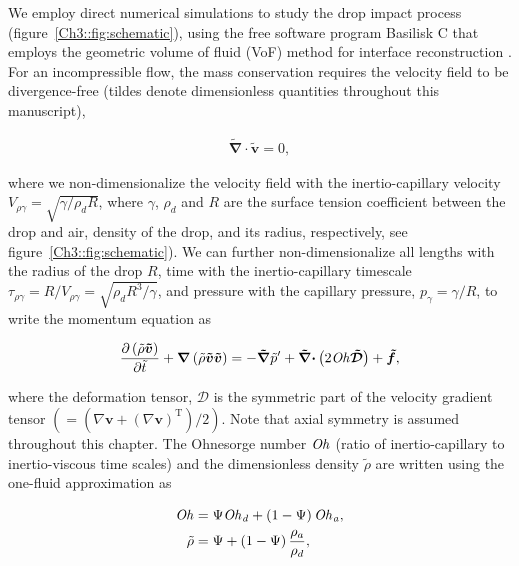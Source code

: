 We employ direct numerical simulations to study the drop impact process (figure~\ref{Ch3::fig:schematic}), using the free software program Basilisk C \citep{basiliskpopinet1} that employs the geometric volume of fluid (VoF) method for interface reconstruction \citep{popinet2009accurate}. For an incompressible flow, the mass conservation requires the velocity field to be divergence-free (tildes denote dimensionless quantities throughout this manuscript),

\begin{align}
	\boldsymbol{\tilde{\nabla}\cdot \tilde{v}} = 0,
\end{align}

\noindent where we non-dimensionalize the velocity field with the inertio-capillary velocity $ V_{\rho\gamma} = \sqrt{\gamma/\rho_d R}$, where $\gamma$, $\rho_d$ and $R$ are the surface tension coefficient between the drop and air, density of the drop, and its radius, respectively, see figure~\ref{Ch3::fig:schematic}). We can further non-dimensionalize all lengths with the radius of the drop $R$, time with the inertio-capillary timescale $\tau_{\rho\gamma} = R/V_{\rho\gamma} = \sqrt{\rho_dR^3/\gamma}$, and pressure with the capillary pressure, $p_\gamma = \gamma/R$, to write the momentum equation as

\begin{align}
	\label{eq::NS}
	\frac{\partial \left(\tilde{\rho}\boldsymbol{\tilde{v}}\right)}{\partial \tilde{t}} + \boldsymbol{\nabla}\left(\tilde{\rho}\boldsymbol{\tilde{v}}\boldsymbol{\tilde{v}}\right) = -\boldsymbol{\tilde{\nabla}} \tilde{p}^{\prime} + \boldsymbol{\tilde{\nabla}\cdot}\left(2\mathit{Oh}\boldsymbol{\tilde{\mathcal{D}}}\right)  + \boldsymbol{\tilde{f}},
\end{align}

\noindent where the deformation tensor, $\boldsymbol{\mathcal{D}}$ is the symmetric part of the velocity gradient tensor $\left(= \left(\nabla\boldsymbol{v} + \left(\nabla\boldsymbol{v}\right)^{\text{T}}\right)/2\right)$. Note that axial symmetry is assumed throughout this chapter. The Ohnesorge number $\mathit{Oh}$ (ratio of inertio-capillary to inertio-viscous time scales) and the dimensionless density $\tilde{\rho}$ are written using the one-fluid approximation \citep{prosperetti2009computational, tryggvason2011direct} as 

\begin{align}
	\label{Ch3::eq::Oh}
	\mathit{Oh} &= \Psi\mathit{Oh}_\mathit{d} + \left(1-\Psi\right)\mathit{Oh}_\mathit{a},\\
	\label{Ch3::eq::density}
	\tilde{\rho} &= \Psi + \left(1-\Psi\right)\frac{\rho_a}{\rho_d},
\end{align}

